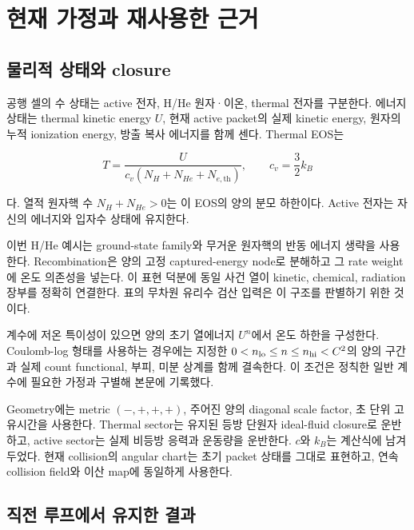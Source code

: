 \hypertarget{uxd604uxc7ac-uxac00uxc815uxacfc-uxc7acuxc0acuxc6a9uxd55c-uxadfcuxac70}{%
\section{현재 가정과 재사용한 근거}\label{uxd604uxc7ac-uxac00uxc815uxacfc-uxc7acuxc0acuxc6a9uxd55c-uxadfcuxac70}}

\hypertarget{uxbb3cuxb9acuxc801-uxc0c1uxd0dcuxc640-closure}{%
\subsection{물리적 상태와 closure}\label{uxbb3cuxb9acuxc801-uxc0c1uxd0dcuxc640-closure}}

공행 셀의 수 상태는 active 전자, H/He 원자·이온, thermal 전자를 구분한다. 에너지 상태는 thermal kinetic energy \(U\), 현재 active packet의 실제 kinetic energy, 원자의 누적 ionization energy, 방출 복사 에너지를 함께 센다. Thermal EOS는

\[
T=\frac{U}{c_v(N_H+N_{He}+N_{e,\mathrm{th}})},\qquad
c_v=\frac32k_B
\]

다. 열적 원자핵 수 \(N_H+N_{He}>0\)는 이 EOS의 양의 분모 하한이다. Active 전자는 자신의 에너지와 입자수 상태에 유지한다.

이번 H/He 예시는 ground-state family와 무거운 원자핵의 반동 에너지 생략을 사용한다. Recombination은 양의 고정 captured-energy node로 분해하고 그 rate weight에 온도 의존성을 넣는다. 이 표현 덕분에 동일 사건 열이 kinetic, chemical, radiation 장부를 정확히 연결한다. 표의 무차원 유리수 검산 입력은 이 구조를 판별하기 위한 것이다.

계수에 저온 특이성이 있으면 양의 초기 열에너지 \(U^n\)에서 온도 하한을 구성한다. Coulomb-log 형태를 사용하는 경우에는 지정한 \(0<n_{\rm lo}\le n\le n_{\rm hi}<C^2\)의 양의 구간과 실제 count functional, 부피, 미분 상계를 함께 결속한다. 이 조건은 정칙한 일반 계수에 필요한 가정과 구별해 본문에 기록했다.

Geometry에는 metric \((-,+,+,+)\), 주어진 양의 diagonal scale factor, 초 단위 고유시간을 사용한다. Thermal sector는 유지된 등방 단원자 ideal-fluid closure로 운반하고, active sector는 실제 비등방 응력과 운동량을 운반한다. \(c\)와 \(k_B\)는 계산식에 남겨 두었다. 현재 collision의 angular chart는 초기 packet 상태를 그대로 표현하고, 연속 collision field와 이산 map에 동일하게 사용한다.

\hypertarget{uxc9c1uxc804-uxb8e8uxd504uxc5d0uxc11c-uxc720uxc9c0uxd55c-uxacb0uxacfc}{%
\subsection{직전 루프에서 유지한 결과}\label{uxc9c1uxc804-uxb8e8uxd504uxc5d0uxc11c-uxc720uxc9c0uxd55c-uxacb0uxacfc}}

